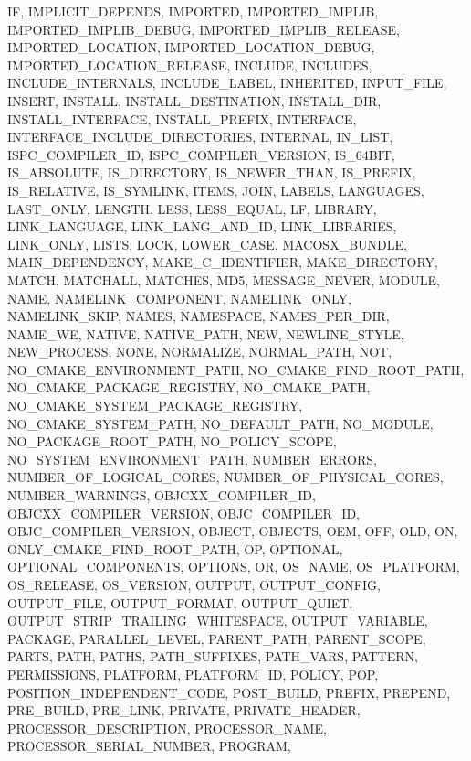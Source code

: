 {{    IF,
    IMPLICIT_DEPENDS,
    IMPORTED,
    IMPORTED_IMPLIB,
    IMPORTED_IMPLIB_DEBUG,
    IMPORTED_IMPLIB_RELEASE,
    IMPORTED_LOCATION,
    IMPORTED_LOCATION_DEBUG,
    IMPORTED_LOCATION_RELEASE,
    INCLUDE,
    INCLUDES,
    INCLUDE_INTERNALS,
    INCLUDE_LABEL,
    INHERITED,
    INPUT_FILE,
    INSERT,
    INSTALL,
    INSTALL_DESTINATION,
    INSTALL_DIR,
    INSTALL_INTERFACE,
    INSTALL_PREFIX,
    INTERFACE,
    INTERFACE_INCLUDE_DIRECTORIES,
    INTERNAL,
    IN_LIST,
    ISPC_COMPILER_ID,
    ISPC_COMPILER_VERSION,
    IS_64BIT,
    IS_ABSOLUTE,
    IS_DIRECTORY,
    IS_NEWER_THAN,
    IS_PREFIX,
    IS_RELATIVE,
    IS_SYMLINK,
    ITEMS,
    JOIN,
    LABELS,
    LANGUAGES,
    LAST_ONLY,
    LENGTH,
    LESS,
    LESS_EQUAL,
    LF,
    LIBRARY,
    LINK_LANGUAGE,
    LINK_LANG_AND_ID,
    LINK_LIBRARIES,
    LINK_ONLY,
    LISTS,
    LOCK,
    LOWER_CASE,
    MACOSX_BUNDLE,
    MAIN_DEPENDENCY,
    MAKE_C_IDENTIFIER,
    MAKE_DIRECTORY,
    MATCH,
    MATCHALL,
    MATCHES,
    MD5,
    MESSAGE_NEVER,
    MODULE,
    NAME,
    NAMELINK_COMPONENT,
    NAMELINK_ONLY,
    NAMELINK_SKIP,
    NAMES,
    NAMESPACE,
    NAMES_PER_DIR,
    NAME_WE,
    NATIVE,
    NATIVE_PATH,
    NEW,
    NEWLINE_STYLE,
    NEW_PROCESS,
    NONE,
    NORMALIZE,
    NORMAL_PATH,
    NOT,
    NO_CMAKE_ENVIRONMENT_PATH,
    NO_CMAKE_FIND_ROOT_PATH,
    NO_CMAKE_PACKAGE_REGISTRY,
    NO_CMAKE_PATH,
    NO_CMAKE_SYSTEM_PACKAGE_REGISTRY,
    NO_CMAKE_SYSTEM_PATH,
    NO_DEFAULT_PATH,
    NO_MODULE,
    NO_PACKAGE_ROOT_PATH,
    NO_POLICY_SCOPE,
    NO_SYSTEM_ENVIRONMENT_PATH,
    NUMBER_ERRORS,
    NUMBER_OF_LOGICAL_CORES,
    NUMBER_OF_PHYSICAL_CORES,
    NUMBER_WARNINGS,
    OBJCXX_COMPILER_ID,
    OBJCXX_COMPILER_VERSION,
    OBJC_COMPILER_ID,
    OBJC_COMPILER_VERSION,
    OBJECT,
    OBJECTS,
    OEM,
    OFF,
    OLD,
    ON,
    ONLY_CMAKE_FIND_ROOT_PATH,
    OP,
    OPTIONAL,
    OPTIONAL_COMPONENTS,
    OPTIONS,
    OR,
    OS_NAME,
    OS_PLATFORM,
    OS_RELEASE,
    OS_VERSION,
    OUTPUT,
    OUTPUT_CONFIG,
    OUTPUT_FILE,
    OUTPUT_FORMAT,
    OUTPUT_QUIET,
    OUTPUT_STRIP_TRAILING_WHITESPACE,
    OUTPUT_VARIABLE,
    PACKAGE,
    PARALLEL_LEVEL,
    PARENT_PATH,
    PARENT_SCOPE,
    PARTS,
    PATH,
    PATHS,
    PATH_SUFFIXES,
    PATH_VARS,
    PATTERN,
    PERMISSIONS,
    PLATFORM,
    PLATFORM_ID,
    POLICY,
    POP,
    POSITION_INDEPENDENT_CODE,
    POST_BUILD,
    PREFIX,
    PREPEND,
    PRE_BUILD,
    PRE_LINK,
    PRIVATE,
    PRIVATE_HEADER,
    PROCESSOR_DESCRIPTION,
    PROCESSOR_NAME,
    PROCESSOR_SERIAL_NUMBER,
    PROGRAM,
}}
